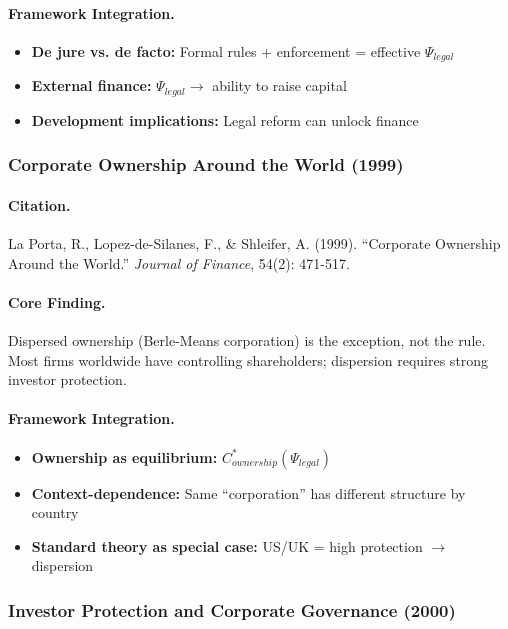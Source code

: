 \documentclass[12pt,a4paper]{article}
\begin{document}
\paragraph{Framework Integration.}
\begin{itemize}
  \item \textbf{De jure vs. de facto:} Formal rules + enforcement = effective $\Psi_{legal}$
  \item \textbf{External finance:} $\Psi_{legal} \to$ ability to raise capital
  \item \textbf{Development implications:} Legal reform can unlock finance
\end{itemize}

\subsubsection{Corporate Ownership Around the World (1999)}

\paragraph{Citation.}
La Porta, R., Lopez-de-Silanes, F., \& Shleifer, A. (1999).
``Corporate Ownership Around the World.'' \emph{Journal of Finance}, 54(2): 471-517.

\paragraph{Core Finding.}
Dispersed ownership (Berle-Means corporation) is the exception, not the rule.
Most firms worldwide have controlling shareholders; dispersion requires
strong investor protection.

\paragraph{Framework Integration.}
\begin{itemize}
  \item \textbf{Ownership as equilibrium:} $C^*_{ownership}(\Psi_{legal})$
  \item \textbf{Context-dependence:} Same ``corporation'' has different structure by country
  \item \textbf{Standard theory as special case:} US/UK = high protection $\to$ dispersion
\end{itemize}

\subsubsection{Investor Protection and Corporate Governance (2000)}
\end{document}
